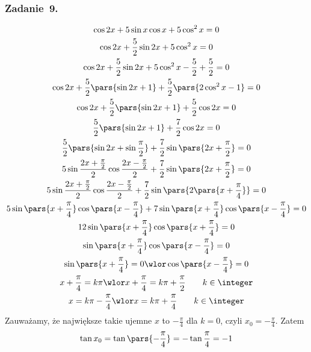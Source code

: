 \subsubsection*{Zadanie~9.}
\begin{gather*}
    \cos2x + 5\sin x\cos x + 5\cos^2x = 0\\
    \cos2x + \frac{5}{2}\sin2x + 5\cos^2x = 0\\
    \cos2x + \frac{5}{2}\sin2x + 5\cos^2x - \frac{5}{2} + \frac{5}{2} = 0\\
    \cos2x + \frac{5}{2}\pars{\sin2x + 1} + \frac{5}{2}\pars{2\cos^2x - 1} = 0\\
    \cos2x + \frac{5}{2}\pars{\sin2x + 1} + \frac{5}{2}\cos2x = 0\\
    \frac{5}{2}\pars{\sin2x + 1} + \frac{7}{2}\cos2x = 0\\
    \frac{5}{2}\pars{\sin2x + \sin\frac{\pi}{2}} + \frac{7}{2}\sin\pars{2x + \frac{\pi}{2}} = 0\\
    5\sin\frac{2x + \frac{\pi}{2}}{2}\cos\frac{2x - \frac{\pi}{2}}{2} + \frac{7}{2}\sin\pars{2x + \frac{\pi}{2}} = 0\\
    5\sin\frac{2x + \frac{\pi}{2}}{2}\cos\frac{2x - \frac{\pi}{2}}{2} + \frac{7}{2}\sin\pars{2\pars{x + \frac{\pi}{4}}} = 0\\
    5\sin\pars{x + \frac{\pi}{4}}\cos\pars{x - \frac{\pi}{4}} + 7\sin\pars{x + \frac{\pi}{4}}\cos\pars{x - \frac{\pi}{4}} = 0\\
    12\sin\pars{x + \frac{\pi}{4}}\cos\pars{x + \frac{\pi}{4}} = 0\\
    \sin\pars{x + \frac{\pi}{4}}\cos\pars{x - \frac{\pi}{4}} = 0\\
    \sin\pars{x + \frac{\pi}{4}} = 0 \wlor \cos\pars{x - \frac{\pi}{4}} = 0\\
    x + \frac{\pi}{4} = k\pi \wlor x + \frac{\pi}{4} = k\pi + \frac{\pi}{2} \qquad k \in \integer\\
    x = k\pi - \frac{\pi}{4} \wlor x = k\pi + \frac{\pi}{4} \qquad k \in \integer
\end{gather*}
Zauważamy, że największe takie ujemne \(x\) to \(-\frac{\pi}{4}\) dla \(k = 0\), czyli \(x_0 = -\frac{\pi}{4}\). Zatem
\begin{equation*}
    \tan x_0 = \tan\pars{-\frac{\pi}{4}} = -\tan\frac{\pi}{4} = -1
\end{equation*}
